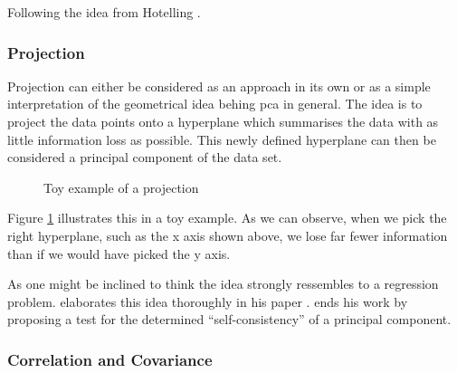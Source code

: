 Following the idea from Hotelling \cite{deisenroth2020mathematics, hotelling1933analysis}. 

\subsubsection{Projection}



Projection can either be considered as an approach in its own or as a simple interpretation of the geometrical idea behing \gls{pca} in general.
The idea is to project the data points onto a \gls{hyperplane} which summarises the data with as little information loss as possible.
This newly defined hyperplane can then be considered a principal component of the data set.


\renewcommand{\tikzscale}{0.4}
\begin{figure}[h]
	\centering
	
	\captionsetup{justification=centering}
	\vspace*{4mm}
	\caption{Toy example of a projection}
    \label{fig:projectionExample}
\end{figure}


Figure \ref{fig:projectionExample} illustrates this in a toy example.
As we can observe, when we pick the right \gls{hyperplane}, such as the x axis shown above, we lose far fewer information than if we would have picked the y axis.\bigskip


As one might be inclined to think the idea strongly ressembles to a regression problem. 
\citeauthor{tarpey1999self} elaborates this idea thoroughly in his paper  \cite{tarpey1999self}.
\citeauthor{tarpey1999self} ends his work by proposing a test for the determined ``self-consistency'' of a principal component.






\clearpage



\subsubsection{Correlation and Covariance} \label{section:correlationANDcovariance}

